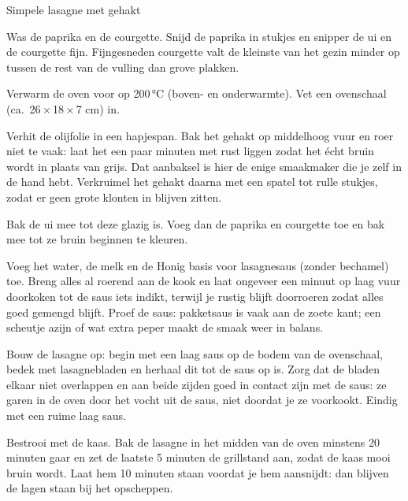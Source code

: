 \begin{recipe}{Simpele lasagne met gehakt}
\begin{steps}
  \item Was de paprika en de courgette. Snijd de paprika in stukjes en snipper de
        ui en de courgette fijn. Fijngesneden courgette valt de kleinste van het
        gezin minder op tussen de rest van de vulling dan grove plakken.
  \item Verwarm de oven voor op 200\,°C (boven- en onderwarmte). Vet een ovenschaal
        (ca.\ 26\,×\,18\,×\,7 cm) in.
  \item Verhit de olijfolie in een hapjespan. Bak het gehakt op middelhoog vuur en
        roer niet te vaak: laat het een paar minuten met rust liggen zodat het
        écht bruin wordt in plaats van grijs. Dat aanbaksel is hier de enige
        smaakmaker die je zelf in de hand hebt. Verkruimel het gehakt daarna met
        een spatel tot rulle stukjes, zodat er geen grote klonten in blijven zitten.
  \item Bak de ui mee tot deze glazig is. Voeg dan de paprika en courgette toe en
        bak mee tot ze bruin beginnen te kleuren.
  \item Voeg het water, de melk en de Honig basis voor lasagnesaus (zonder
        bechamel) toe. Breng alles al roerend aan de kook en laat ongeveer
        een minuut op laag vuur doorkoken tot de saus iets indikt, terwijl
        je rustig blijft doorroeren zodat alles goed gemengd blijft. Proef de
        saus: pakketsaus is vaak aan de zoete kant; een scheutje azijn of
        wat extra peper maakt de smaak weer in balans.
  \item Bouw de lasagne op: begin met een laag saus op de bodem van de
        ovenschaal, bedek met lasagnebladen en herhaal dit tot de saus op
        is. Zorg dat de bladen elkaar niet overlappen en aan beide zijden
        goed in contact zijn met de saus: ze garen in de oven door het
        vocht uit de saus, niet doordat je ze voorkookt. Eindig met een
        ruime laag saus.
  \item Bestrooi met de kaas. Bak de lasagne in het midden van de oven
        minstens 20 minuten gaar en zet de laatste 5 minuten de grillstand
        aan, zodat de kaas mooi bruin wordt. Laat hem 10 minuten staan
        voordat je hem aansnijdt: dan blijven de lagen staan bij het
        opscheppen.
\end{steps}

\end{recipe}
